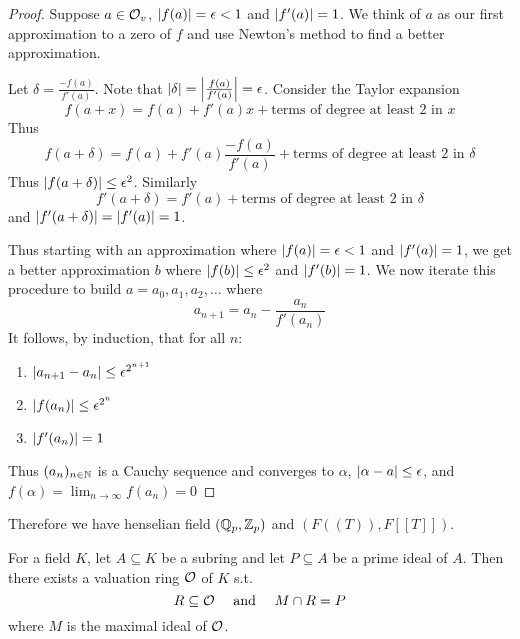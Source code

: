 \documentclass[11pt]{article}
\begin{document}
\begin{proof}
Suppose \(a\in\mathcal{O}_v\), \(\abs{f(a)}=\epsilon<1\) and \(\abs{f'(a)}=1\). We think of \(a\) as our first
approximation to a zero of \(f\) and use Newton's method to find a better approximation.

Let \(\delta=\frac{-f(a)}{f'(a)}\). Note that \(\abs{\delta}=\abs{\frac{f(a)}{f'(a)}}=\epsilon\). Consider the
Taylor expansion
\begin{equation*}
f(a+x)=f(a)+f'(a)x+\text{terms of degree at least 2 in \(x\)}
\end{equation*}
Thus
\begin{equation*}
f(a+\delta)=f(a)+f'(a)\frac{-f(a)}{f'(a)}+\text{terms of degree at least 2 in \(\delta\)}
\end{equation*}
Thus \(\abs{f(a+\delta)}\le\epsilon^2\). Similarly
\begin{equation*}
f'(a+\delta)=f'(a)+\text{terms of degree at least 2 in \(\delta\)}
\end{equation*}
and \(\abs{f'(a+\delta)}=\abs{f'(a)}=1\).

Thus starting with an approximation where \(\abs{f(a)}=\epsilon<1\) and \(\abs{f'(a)}=1\), we get a
better approximation \(b\) where \(\abs{f(b)}\le\epsilon^2\) and \(\abs{f'(b)}=1\). We now iterate this
procedure to build \(a=a_0,a_1,a_2,\dots\) where
\begin{equation*}
a_{n+1}=a_n-\frac{a_n}{f'(a_n)}
\end{equation*}
It follows, by induction, that for all \(n\):
\begin{enumerate}
\item \(\abs{a_{n+1}-a_n}\le\epsilon^{2^{n+1}}\)
\item \(\abs{f(a_n)}\le\epsilon^{2^n}\)
\item \(\abs{f'(a_n)}=1\)
\end{enumerate}
Thus \((a_n)_{n\in\mathbb{N}}\) is a Cauchy sequence and converges to \(\alpha\), \(\abs{\alpha-a}\le\epsilon\), and \(f(\alpha)=\lim_{n\to\infty}f(a_n)=0\)
\end{proof}

Therefore we have henselian field \((\mathbb{Q}_p,\mathbb{Z}_p)\) and \((F((T)),F[[T]])\).

\begin{fact}[Chevalley]
For a field \(K\), let \(A\subseteq K\) be a subring and let \(P\subseteq A\) be a prime ideal of \(A\). Then
there exists a valuation ring \(\mathcal{O}\) of \(K\) s.t.
\begin{equation*}
R\subseteq\mathcal{O} \quad\text{ and }\quad M\cap R=P
\end{equation*}
where \(M\) is the maximal ideal of \(\mathcal{O}\).
\end{fact}
\end{document}
